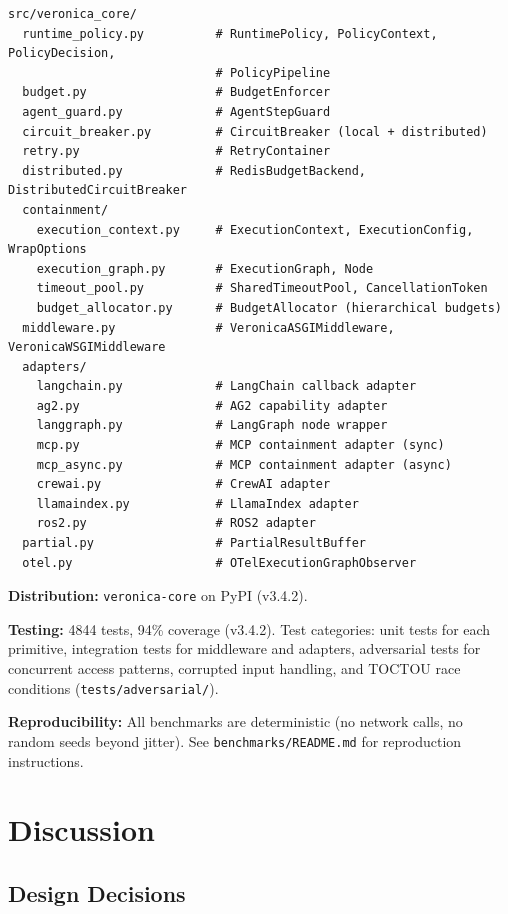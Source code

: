 \documentclass[11pt]{article}
\begin{document}
\begin{lstlisting}[style=plain]
src/veronica_core/
  runtime_policy.py          # RuntimePolicy, PolicyContext, PolicyDecision,
                             # PolicyPipeline
  budget.py                  # BudgetEnforcer
  agent_guard.py             # AgentStepGuard
  circuit_breaker.py         # CircuitBreaker (local + distributed)
  retry.py                   # RetryContainer
  distributed.py             # RedisBudgetBackend, DistributedCircuitBreaker
  containment/
    execution_context.py     # ExecutionContext, ExecutionConfig, WrapOptions
    execution_graph.py       # ExecutionGraph, Node
    timeout_pool.py          # SharedTimeoutPool, CancellationToken
    budget_allocator.py      # BudgetAllocator (hierarchical budgets)
  middleware.py              # VeronicaASGIMiddleware, VeronicaWSGIMiddleware
  adapters/
    langchain.py             # LangChain callback adapter
    ag2.py                   # AG2 capability adapter
    langgraph.py             # LangGraph node wrapper
    mcp.py                   # MCP containment adapter (sync)
    mcp_async.py             # MCP containment adapter (async)
    crewai.py                # CrewAI adapter
    llamaindex.py            # LlamaIndex adapter
    ros2.py                  # ROS2 adapter
  partial.py                 # PartialResultBuffer
  otel.py                    # OTelExecutionGraphObserver
\end{lstlisting}

\textbf{Distribution:} \texttt{veronica-core} on PyPI (v3.4.2).

\textbf{Testing:} 4844 tests, 94\% coverage (v3.4.2). Test categories: unit
tests for each primitive, integration tests for middleware and adapters,
adversarial tests for concurrent access patterns, corrupted input handling,
and TOCTOU race conditions (\texttt{tests/adversarial/}).

\textbf{Reproducibility:} All benchmarks are deterministic (no network calls,
no random seeds beyond jitter). See \texttt{benchmarks/README.md} for
reproduction instructions.

\section{Discussion}
\label{sec:discussion}

\subsection{Design Decisions}
\end{document}
